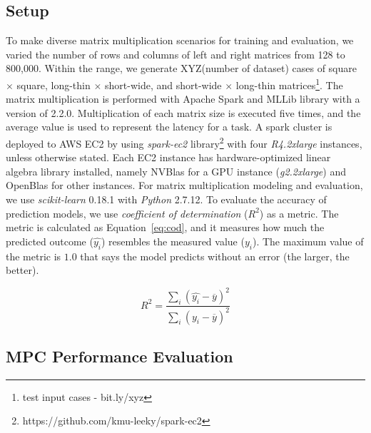 \documentclass[10pt, conference, compsocconf]{IEEEtran}
\begin{document}
\subsection{Setup}
To make diverse matrix multiplication scenarios for training and evaluation, we varied the number of rows and columns of left and right matrices from 128 to 800,000. Within the range, we generate XYZ(number of dataset) cases of square $\times$ square, long-thin $\times$ short-wide, and short-wide $\times$ long-thin matrices\footnote{test input cases - bit.ly/xyz}. The matrix multiplication is performed with Apache Spark and MLLib library with a version of 2.2.0. Multiplication of each matrix size is executed five times, and the average value is used to represent the latency for a task. A spark cluster is deployed to AWS EC2 by using \textit{spark-ec2} library\footnote{https://github.com/kmu-leeky/spark-ec2} with four \textit{R4.2xlarge} instances, unless otherwise stated. Each EC2 instance has hardware-optimized linear algebra library installed, namely NVBlas for a GPU instance (\textit{g2.2xlarge}) and OpenBlas for other instances. For matrix multiplication modeling and evaluation, we use \textit{scikit-learn} 0.18.1 with \textit{Python} 2.7.12. To evaluate the accuracy of prediction models, we use \textit{coefficient of determination} ($R^2$) as a metric. The metric is calculated as Equation~\ref{eq:cod}, and it measures how much the predicted outcome ($\hat{y_i}$) resembles the measured value ($y_i$). The maximum value of the metric is $1.0$ that says the model predicts without an error (the larger, the better).

\begin{equation}\label{eq:cod}
  R^2 = \frac{\sum\limits_{i} (\hat{y_i}-\overline{y})^2}{\sum\limits_{i} (y_i-\overline{y})^2}
\end{equation}


\subsection{MPC Performance Evaluation}
\end{document}
